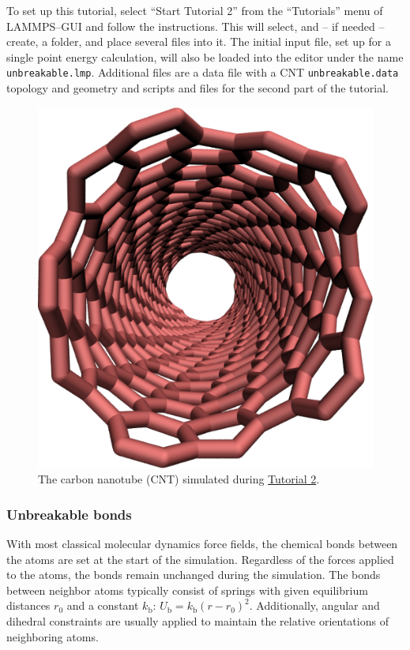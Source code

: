 \documentclass[9pt,tutorial]{livecoms}
\newcommand{\flecmd}[1]{\textcolor{command}{\texttt{#1}}} %
\begin{document}
To set up this tutorial, select ``Start Tutorial 2'' from the
``Tutorials'' menu of LAMMPS--GUI and follow the instructions.  This
will select, and -- if needed -- create, a folder, and place several
files into it.  The initial input file, set up for a single point energy
calculation, will also be loaded into the editor under the name
\flecmd{unbreakable.lmp}.  Additional files are a data file with a CNT
\flecmd{unbreakable.data} topology and geometry and scripts and files
for the second part of the tutorial.

\begin{figure}
\centering
\includegraphics[width=0.55\linewidth]{CNT}
\caption{The carbon nanotube (CNT) simulated during
\hyperref[carbon-nanotube-label]{Tutorial 2}.}
\label{fig:CNT}
\end{figure}

\subsubsection{Unbreakable bonds}
With most classical molecular dynamics force fields, the chemical bonds
between the atoms are set at the start of the simulation. Regardless of
the forces applied to the atoms, the bonds remain unchanged during the
simulation. The bonds between neighbor atoms typically consist of
springs with given equilibrium distances $r_0$ and a constant
$k_\text{b}$: $U_\text{b} = k_\text{b} \left( r - r_0
\right)^2$. Additionally, angular and dihedral constraints are usually
applied to maintain the relative orientations of neighboring atoms.
\end{document}
